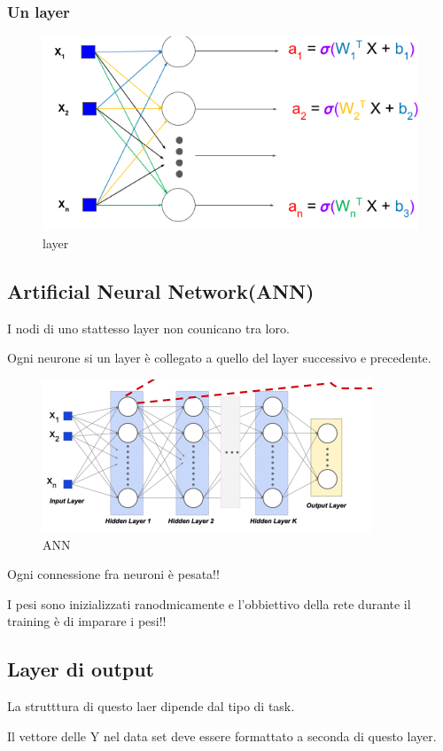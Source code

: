 \subsubsection{Un layer}
\begin{figure}[H]
    \centering
    \includegraphics[width=0.7\linewidth]{imgs/layer}
    \caption{layer}
    \label{fig:layer}
\end{figure}


\subsection{Artificial Neural Network(ANN)}
I nodi di uno stattesso layer non counicano tra loro.

Ogni neurone si un layer è collegato a quello del layer successivo e precedente.

\begin{figure}[H]
    \centering
    \includegraphics[width=0.6\linewidth]{imgs/ann}
    \caption{ANN}
    \label{fig:ANN}
\end{figure}


Ogni connessione fra neuroni è pesata!!

I pesi sono inizializzati ranodmicamente e l'obbiettivo della rete
durante il training è di imparare i pesi!!

\subsection{Layer di output}
La strutttura di questo laer dipende dal tipo di task.

Il vettore delle Y nel data set deve essere formattato a seconda di questo layer.

